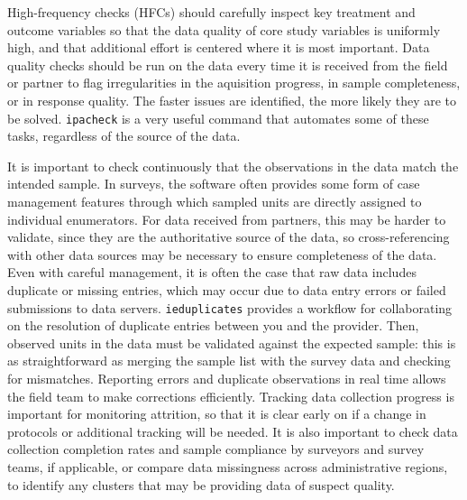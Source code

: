 High-frequency checks (HFCs) should carefully inspect key treatment and outcome variables
so that the data quality of core study variables is uniformly high,
and that additional effort is centered where it is most important.
Data quality checks should be run on the data every time it is received from the field or partner
to flag irregularities in the aquisition progress, in sample completeness, or in response quality.
The faster issues are identified, the more likely they are to be solved.
\texttt{ipacheck}
is a very useful command that automates some of these tasks,
regardless of the source of the data.

It is important to check continuously that the observations in the data match the intended sample.
In surveys, the software often provides some form of case management features
through which sampled units are directly assigned to individual enumerators.
For data received from partners, this may be harder to validate,
since they are the authoritative source of the data,
so cross-referencing with other data sources may be necessary to ensure completeness of the data.
Even with careful management, it is often the case that raw data includes duplicate or missing entries,
which may occur due to data entry errors or failed submissions to data servers.
\texttt{ieduplicates}
provides a workflow for collaborating on the resolution of duplicate entries between you and the provider.
Then, observed units in the data must be validated against the expected sample:
this is as straightforward as merging the sample list with the survey data and checking for mismatches.
Reporting errors and duplicate observations in real time allows the field team to make corrections efficiently.
Tracking data collection progress is important for monitoring attrition,
so that it is clear early on if a change in protocols or additional tracking will be needed.
It is also important to check data collection completion rates
and sample compliance by surveyors and survey teams, if applicable,
or compare data missingness across administrative regions,
to identify any clusters that may be providing data of suspect quality.

